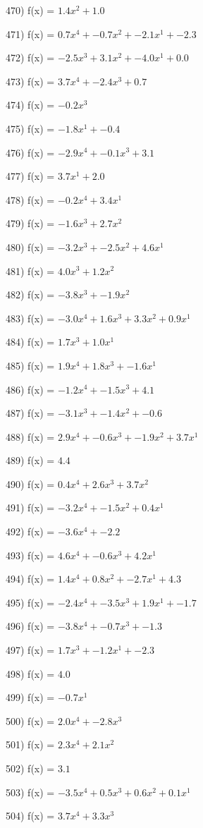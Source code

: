 \documentclass[10pt,a4paper]{article}
\begin{document}
470) f(x) = $1.4x^2 + 1.0$

471) f(x) = $0.7x^4 + -0.7x^2 + -2.1x^1 + -2.3$

472) f(x) = $-2.5x^3 + 3.1x^2 + -4.0x^1 + 0.0$

473) f(x) = $3.7x^4 + -2.4x^3 + 0.7$

474) f(x) = $-0.2x^3$

475) f(x) = $-1.8x^1 + -0.4$

476) f(x) = $-2.9x^4 + -0.1x^3 + 3.1$

477) f(x) = $3.7x^1 + 2.0$

478) f(x) = $-0.2x^4 + 3.4x^1$

479) f(x) = $-1.6x^3 + 2.7x^2$

480) f(x) = $-3.2x^3 + -2.5x^2 + 4.6x^1$

481) f(x) = $4.0x^3 + 1.2x^2$

482) f(x) = $-3.8x^3 + -1.9x^2$

483) f(x) = $-3.0x^4 + 1.6x^3 + 3.3x^2 + 0.9x^1$

484) f(x) = $1.7x^3 + 1.0x^1$

485) f(x) = $1.9x^4 + 1.8x^3 + -1.6x^1$

486) f(x) = $-1.2x^4 + -1.5x^3 + 4.1$

487) f(x) = $-3.1x^3 + -1.4x^2 + -0.6$

488) f(x) = $2.9x^4 + -0.6x^3 + -1.9x^2 + 3.7x^1$

489) f(x) = $4.4$

490) f(x) = $0.4x^4 + 2.6x^3 + 3.7x^2$

491) f(x) = $-3.2x^4 + -1.5x^2 + 0.4x^1$

492) f(x) = $-3.6x^4 + -2.2$

493) f(x) = $4.6x^4 + -0.6x^3 + 4.2x^1$

494) f(x) = $1.4x^4 + 0.8x^2 + -2.7x^1 + 4.3$

495) f(x) = $-2.4x^4 + -3.5x^3 + 1.9x^1 + -1.7$

496) f(x) = $-3.8x^4 + -0.7x^3 + -1.3$

497) f(x) = $1.7x^3 + -1.2x^1 + -2.3$

498) f(x) = $4.0$

499) f(x) = $-0.7x^1$

500) f(x) = $2.0x^4 + -2.8x^3$

501) f(x) = $2.3x^4 + 2.1x^2$

502) f(x) = $3.1$

503) f(x) = $-3.5x^4 + 0.5x^3 + 0.6x^2 + 0.1x^1$

504) f(x) = $3.7x^4 + 3.3x^3$
\end{document}
